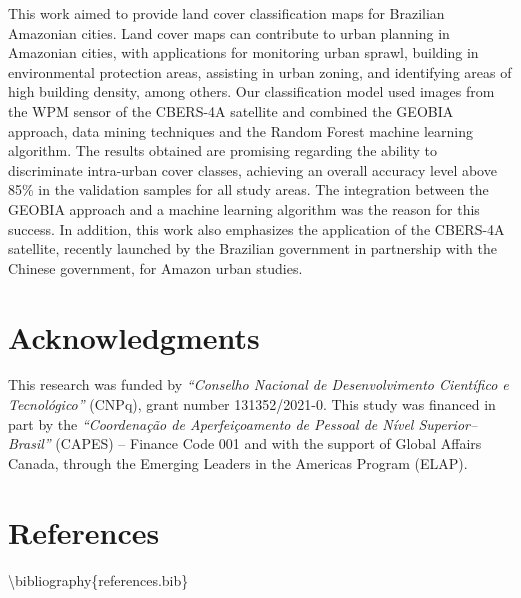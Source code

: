 \documentclass[preprint, 3p,
authoryear]{elsarticle} %
\begin{document}
This work aimed to provide land cover classification maps for Brazilian
Amazonian cities. Land cover maps can contribute to urban planning in
Amazonian cities, with applications for monitoring urban sprawl,
building in environmental protection areas, assisting in urban zoning,
and identifying areas of high building density, among others. Our
classification model used images from the WPM sensor of the CBERS-4A
satellite and combined the GEOBIA approach, data mining techniques and
the Random Forest machine learning algorithm. The results obtained are
promising regarding the ability to discriminate intra-urban cover
classes, achieving an overall accuracy level above 85\% in the
validation samples for all study areas. The integration between the
GEOBIA approach and a machine learning algorithm was the reason for this
success. In addition, this work also emphasizes the application of the
CBERS-4A satellite, recently launched by the Brazilian government in
partnership with the Chinese government, for Amazon urban studies.

\hypertarget{acknowledgments}{%
\section{Acknowledgments}\label{acknowledgments}}

This research was funded by \emph{``Conselho Nacional de Desenvolvimento
Científico e Tecnológico''} (CNPq), grant number 131352/2021-0. This
study was financed in part by the \emph{``Coordenação de Aperfeiçoamento
de Pessoal de Nível Superior--Brasil''} (CAPES) -- Finance Code 001 and
with the support of Global Affairs Canada, through the Emerging Leaders
in the Americas Program (ELAP).

\hypertarget{references}{%
\section{References}\label{references}}

\textbackslash bibliography\{references.bib\}


\end{document}
